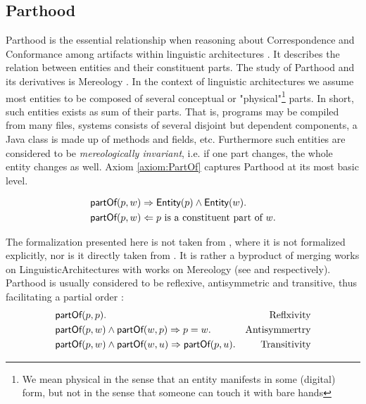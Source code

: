 \subsection{Parthood}
\label{subsection:Parthood}
\Gls{Parthood} is the essential relationship when reasoning about \gls{Correspondence} and \gls{Conformance} among artifacts within linguistic architectures \cite{DBLP:conf/sle/Lammel16} \cite{DBLP:conf/modelsward/HeinzLV17}.
It describes the relation between entities and their constituent parts.
The study of \gls{Parthood} and its derivatives is \gls{Mereology} \cite{DBLP:journals/dke/Varzi96} \cite{SEP:Mereology}.
In the context of linguistic architectures we assume most entities to be
composed of several conceptual or "physical"\footnote{We mean physical in the sense that an entity manifests in some (digital) form, but not in the sense that someone can touch it with bare hands} parts.
In short, such entities exists as sum of their parts.
That is, programs may be compiled from many files, systems consists of several disjoint but dependent components, a \gls{Java} class is made up of methods and fields, etc.
Furthermore such entities are considered to be \textit{mereologically invariant}, i.e. if one part changes, the whole entity changes as well. 
Axiom \ref{axiom:PartOf} captures \gls{Parthood} at its most basic level.
\begin{axiom}[\partOf]
\label{axiom:PartOf}
\begin{align*}
&\textsf{partOf}(p,w)
\Rightarrow
\textsf{Entity}(p) \wedge \textsf{Entity}(w).\\
&\textsf{partOf}(p,w)
\Leftarrow
p \text{ is a constituent part of } w.
\end{align*}
\end{axiom}
The formalization presented here is not taken from \cite{DBLP:conf/modelsward/HeinzLV17}, where it is not formalized explicitly, nor is it directly taken from \cite{DBLP:conf/sle/Lammel16}.
It is rather a byproduct of merging works on \glspl{LinguisticArchitecture} with works on \gls{Mereology} (see \cite{DBLP:conf/sle/Lammel16} \cite{DBLP:conf/modelsward/HeinzLV17} and \cite{DBLP:journals/dke/Varzi96} \cite{SEP:Mereology} respectively). 
\Gls{Parthood} is usually considered to be reflexive, antisymmetric and transitive, thus facilitating a partial order \cite{DBLP:journals/dke/Varzi96} \cite{SEP:Mereology}:
\begin{align*}
&\textsf{partOf}(p,p).
&\text{Reflxivity}
\\
&\textsf{partOf}(p,w) \wedge \textsf{partOf}(w,p) \Rightarrow p = w. 
&\text{Antisymmertry}
\\
&\textsf{partOf}(p,w) \wedge \textsf{partOf}(w,u) \Rightarrow \textsf{partOf}(p,u). 
&\text{Transitivity}
\end{align*}
